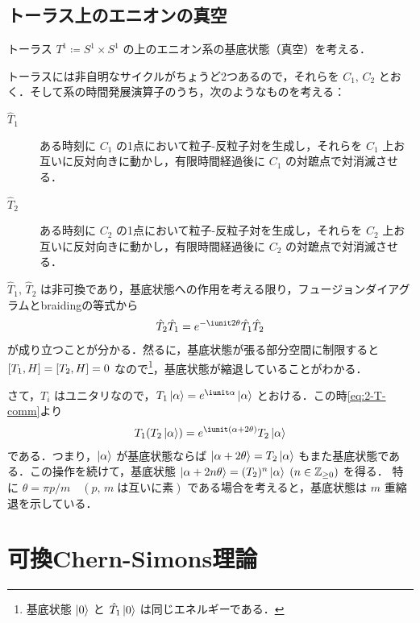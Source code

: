 \documentclass[TQFT_main]{subfiles}
\begin{document}
\subsection{トーラス上のエニオンの真空}

トーラス $T^1 \coloneqq S^1 \times S^1$ の上のエニオン系の基底状態（真空）を考える．

トーラスには非自明なサイクルがちょうど2つあるので，それらを $C_1,\, C_2$ とおく．そして系の時間発展演算子のうち，次のようなものを考える：
\begin{description}
    \item[\textbf{$\hat{T}_1$}] ある時刻に $C_1$ の1点において粒子-反粒子対を生成し，それらを $C_1$ 上お互いに反対向きに動かし，有限時間経過後に $C_1$ の対蹠点で対消滅させる．
    \item[\textbf{$\hat{T}_2$}] ある時刻に $C_2$ の1点において粒子-反粒子対を生成し，それらを $C_2$ 上お互いに反対向きに動かし，有限時間経過後に $C_2$ の対蹠点で対消滅させる．
\end{description}
$\hat{T}_1,\, \hat{T}_2$ は非可換であり，基底状態への作用を考える限り，フュージョンダイアグラムとbraidingの等式から
\begin{align}
    \label{eq:2-T-comm}
    \hat{T}_2 \hat{T}_1 = e^{-\iunit 2 \theta} \hat{T}_1 \hat{T}_2
\end{align}
が成り立つことが分かる．然るに，基底状態が張る部分空間に制限すると $\comm{T_1}{H} = \comm{T_2}{H} = 0$ なので\footnote{基底状態 $\ket{0}$ と $\hat{T}_1\ket{0}$ は同じエネルギーである．}，基底状態が縮退していることがわかる．

さて，$T_i$ はユニタリなので，$T_1 \ket{\alpha} = e^{\iunit \alpha} \ket{\alpha}$ とおける．この時\eqref{eq:2-T-comm}より
\begin{align}
    T_1 (T_2 \ket{\alpha}) = e^{\iunit (\alpha + 2\theta)} T_2 \ket{\alpha}
\end{align}
である．つまり，$\ket{\alpha}$ が基底状態ならば $\ket{\alpha + 2\theta} = T_2 \ket{\alpha}$ もまた基底状態である．この操作を続けて，基底状態 $\ket{\alpha + 2n \theta} = (T_2)^n \ket{\alpha}\; (n \in \mathbb{Z}_{\ge 0})$ を得る．
特に $\theta = \pi p / m\quad (p,\, m\; \text{は互いに素})$ である場合を考えると，基底状態は $m$ 重縮退を示している．




\section{可換Chern-Simons理論}
\end{document}
